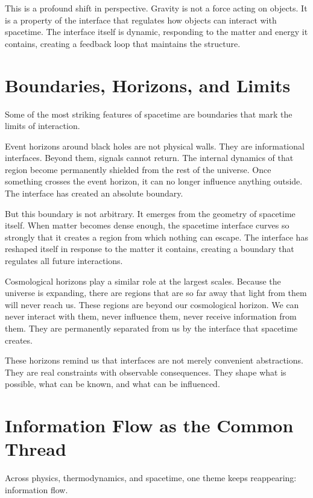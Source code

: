 \documentclass[
  openright]{book}
\begin{document}
This is a profound shift in perspective. Gravity is not a force acting
on objects. It is a property of the interface that regulates how objects
can interact with spacetime. The interface itself is dynamic, responding
to the matter and energy it contains, creating a feedback loop that
maintains the structure.

\section{Boundaries, Horizons, and
Limits}\label{boundaries-horizons-and-limits}

Some of the most striking features of spacetime are boundaries that mark
the limits of interaction.

Event horizons around black holes are not physical walls. They are
informational interfaces. Beyond them, signals cannot return. The
internal dynamics of that region become permanently shielded from the
rest of the universe. Once something crosses the event horizon, it can
no longer influence anything outside. The interface has created an
absolute boundary.

But this boundary is not arbitrary. It emerges from the geometry of
spacetime itself. When matter becomes dense enough, the spacetime
interface curves so strongly that it creates a region from which nothing
can escape. The interface has reshaped itself in response to the matter
it contains, creating a boundary that regulates all future interactions.

Cosmological horizons play a similar role at the largest scales. Because
the universe is expanding, there are regions that are so far away that
light from them will never reach us. These regions are beyond our
cosmological horizon. We can never interact with them, never influence
them, never receive information from them. They are permanently
separated from us by the interface that spacetime creates.

These horizons remind us that interfaces are not merely convenient
abstractions. They are real constraints with observable consequences.
They shape what is possible, what can be known, and what can be
influenced.

\section{Information Flow as the Common
Thread}\label{information-flow-as-the-common-thread}

Across physics, thermodynamics, and spacetime, one theme keeps
reappearing: information flow.
\end{document}
